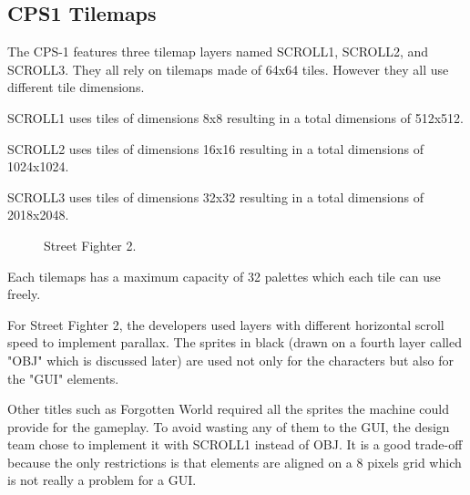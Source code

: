 





\subsection{CPS1 Tilemaps}
The CPS-1 features three tilemap layers named SCROLL1, SCROLL2, and SCROLL3. They all rely on tilemaps made of 64x64 tiles. However they all use different tile dimensions. 

SCROLL1 uses tiles of dimensions 8x8 resulting in a total dimensions of 512x512.

SCROLL2 uses tiles of dimensions 16x16 resulting in a total dimensions of 1024x1024.

SCROLL3 uses tiles of dimensions 32x32 resulting in a total dimensions of 2018x2048.


\vfill
\begin{figure}[!b]
 \caption*{Street Fighter 2.}%
 \end{figure}%
\pagebreak

Each tilemaps has a maximum capacity of 32 palettes which each tile can use freely.

For Street Fighter 2, the developers used layers with different horizontal scroll speed to implement parallax. The sprites in black (drawn on a fourth layer called "OBJ" which is discussed later) are used not only for the characters but also for the "GUI" elements.

Other titles such as Forgotten World required all the sprites the machine could provide for the gameplay. To avoid wasting any of them to the GUI, the design team chose to implement it with SCROLL1 instead of OBJ. It is a good trade-off because the only restrictions is that elements are aligned on a 8 pixels grid which is not really a problem for a GUI.

